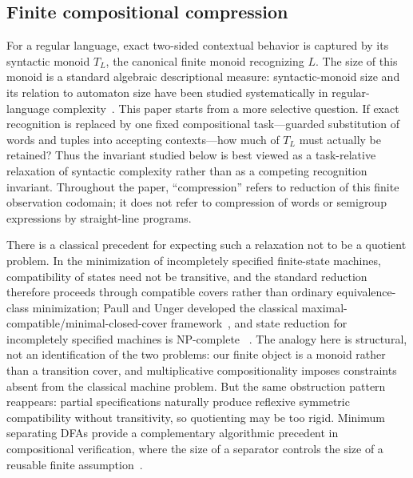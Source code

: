 \documentclass[10pt,a4paper]{article}
\theoremstyle{definition}
\theoremstyle{remark}
\begin{document}
\subsection{Finite compositional compression}

For a regular language, exact two-sided contextual behavior is captured by its
syntactic monoid $T_L$, the canonical finite monoid recognizing $L$.  The size
of this monoid is a standard algebraic descriptional measure: syntactic-monoid
size and its relation to automaton size have been studied systematically in
regular-language complexity~\cite{HolzerKonig2004}.  This paper starts from a
more selective question.  If exact recognition is replaced by one fixed
compositional task---guarded substitution of words and tuples into accepting
contexts---how much of $T_L$ must actually be retained?  Thus the invariant
studied below is best viewed as a task-relative relaxation of syntactic
complexity rather than as a competing recognition invariant.  Throughout the
paper, ``compression'' refers to reduction of this finite observation
codomain; it does not refer to compression of words or semigroup expressions
by straight-line programs.

There is a classical precedent for expecting such a relaxation not to be a
quotient problem.  In the minimization of incompletely specified finite-state
machines, compatibility of states need not be transitive, and the standard
reduction therefore proceeds through compatible covers rather than ordinary
equivalence-class minimization; Paull and Unger developed the classical
maximal-compatible/minimal-closed-cover framework~\cite{PaullUnger1959}, and
state reduction for incompletely specified machines is NP-complete%
~\cite{Pfleeger1973}.  The analogy here is structural, not an identification
of the two problems: our finite object is a monoid rather than a transition
cover, and multiplicative compositionality imposes constraints absent from the
classical machine problem.  But the same obstruction pattern reappears:
partial specifications naturally produce reflexive symmetric compatibility
without transitivity, so quotienting may be too rigid.  Minimum separating
DFAs provide a complementary algorithmic precedent in compositional
verification, where the size of a separator controls the size of a reusable
finite assumption~\cite{ChenFarzanClarkeTsayWang2009,
VazquezPargaGarciaLopez2016}.
\end{document}
